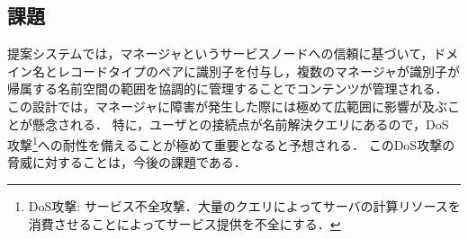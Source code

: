 
\subsection{課題}
提案システムでは，マネージャというサービスノードへの信頼に基づいて，ドメイン名とレコードタイプのペアに識別子を付与し，複数のマネージャが識別子が帰属する名前空間の範囲を協調的に管理することでコンテンツが管理される．
この設計では，マネージャに障害が発生した際には極めて広範囲に影響が及ぶことが懸念される．
特に，ユーザとの接続点が名前解決クエリにあるので，DoS攻撃\footnote{DoS攻撃: サービス不全攻撃．大量のクエリによってサーバの計算リソースを消費させることによってサービス提供を不全にする．}への耐性を備えることが極めて重要となると予想される．
このDoS攻撃の脅威に対することは，今後の課題である．



